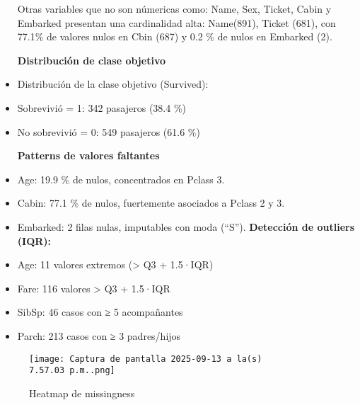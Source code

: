 \documentclass[sjournal]{IEEEtran}
\begin{document}
\begin{itemize}
Otras variables que no son númericas como: Name, Sex, Ticket, Cabin y Embarked presentan una cardinalidad alta: Name(891), Ticket (681), con 77.1\% de valores nulos en Cbin (687) y 0.2 \% de nulos en Embarked (2).

\textbf{Distribución de clase objetivo
}
\item Distribución de la clase objetivo (Survived):


\item Sobrevivió = 1: 342 pasajeros (38.4 \%)


\item No sobrevivió = 0: 549 pasajeros (61.6 \%)

\textbf{Patterns de valores faltantes
}
\item Age: 19.9 \% de nulos, concentrados en Pclass 3.


\item Cabin: 77.1 \% de nulos, fuertemente asociados a Pclass 2 y 3.


\item Embarked: 2 filas nulas, imputables con moda (“S”).
\textbf{Detección de outliers (IQR):}
\item  Age: 11 valores extremos (> Q3 + 1.5·IQR)


\item Fare: 116 valores > Q3 + 1.5·IQR


\item SibSp: 46 casos con ≥ 5 acompañantes


\item Parch: 213 casos con ≥ 3 padres/hijos


\end{itemize}

\begin{figure}[H]
    \centering
    \texttt{[image: Captura de pantalla 2025-09-13 a la(s) 7.57.03 p.m..png]}
    \caption{Heatmap de missingness}
    \label{fig:placeholder}
\end{figure}
\end{document}

